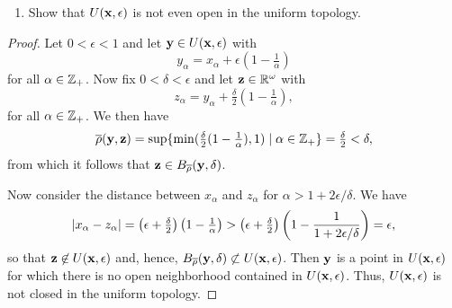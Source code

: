 \begin{solution}
  \begin{enumerate}[label={(\alph*)}, align=left, leftmargin=\parindent, listparindent=\parindent, labelwidth=0pt, itemindent=!]
    \addtocounter{enumi}{1} 
    \item Show that $U(\mathbf{x}, \epsilon)$ is not even open in the uniform topology.
  \end{enumerate}
  \begin{proof}
    Let $0 < \epsilon < 1$ and let $\mathbf{y} \in U(\mathbf{x}, \epsilon)$ with
    \begin{equation*}
      y_\alpha = x_\alpha + \epsilon (1 - \tfrac{1}{\alpha})
    \end{equation*}
    for all $\alpha \in \mathbb{Z}_+$.
    Now fix $0 < \delta < \epsilon$ and let $\mathbf{z} \in \mathbb{R}^\omega$ with
    \begin{equation*}
      z_\alpha = y_\alpha + \tfrac{\delta}{2} (1 - \tfrac{1}{\alpha}),
    \end{equation*}
    for all $\alpha \in \mathbb{Z}_+$.
    We then have
    \begin{equation*}
      \overline{\rho}(\mathbf{y}, \mathbf{z}) = \sup\{ \min(\tfrac{\delta}{2} (1 - \tfrac{1}{\alpha}), 1) \mid \alpha \in \mathbb{Z}_+\} = \tfrac{\delta}{2} < \delta,
    \end{equation*}
    from which it follows that $\mathbf{z} \in B_{\overline{\rho}}(\mathbf{y}, \delta)$.

    Now consider the distance between $x_\alpha$ and $z_\alpha$ for $\alpha > 1 + 2 \epsilon / \delta$.
    We have
    \begin{equation*}
      \left| x_\alpha - z_\alpha \right| = \left(\epsilon + \tfrac{\delta}{2}\right) \left(1 - \tfrac{1}{\alpha}\right) > \left(\epsilon + \tfrac{\delta}{2}\right) \left(1 - \frac{1}{1 + 2 \epsilon / \delta}\right) = \epsilon,
    \end{equation*}
    so that $\mathbf{z} \not\in U(\mathbf{x}, \epsilon)$ and, hence, $B_{\overline{\rho}}(\mathbf{y}, \delta) \not\subset U(\mathbf{x}, \epsilon)$.
    Then $\mathbf{y}$ is a point in $U(\mathbf{x}, \epsilon)$ for which there is no open neighborhood contained in $U(\mathbf{x}, \epsilon)$.
    Thus, $U(\mathbf{x}, \epsilon)$ is not closed in the uniform topology.
  \end{proof}
  \bigskip


\end{solution}
